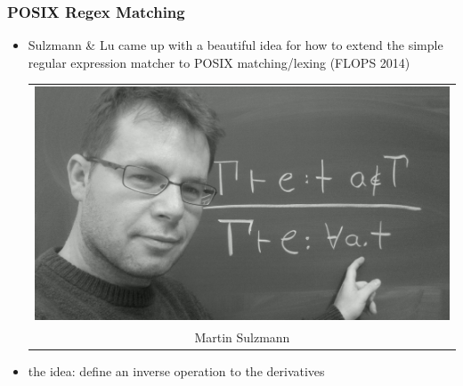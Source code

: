 \documentclass[dvipsnames,14pt,t]{beamer}
\begin{document}
\begin{frame}[c]
\frametitle{POSIX Regex Matching}

\begin{itemize}

\item Sulzmann \& Lu came up with a beautiful
idea for how to extend the simple regular expression 
matcher to POSIX matching/lexing (FLOPS 2014)\bigskip\bigskip\bigskip

\begin{tabular}{@{\hspace{4cm}}c@{}}
  \includegraphics[scale=0.14]{pics/sulzmann.jpg}\\[-2mm]
  \hspace{0cm}\footnotesize Martin Sulzmann
\end{tabular}\bigskip\bigskip

\item the idea: define an inverse operation to the derivatives
\end{itemize}



\end{frame}
\end{document}
